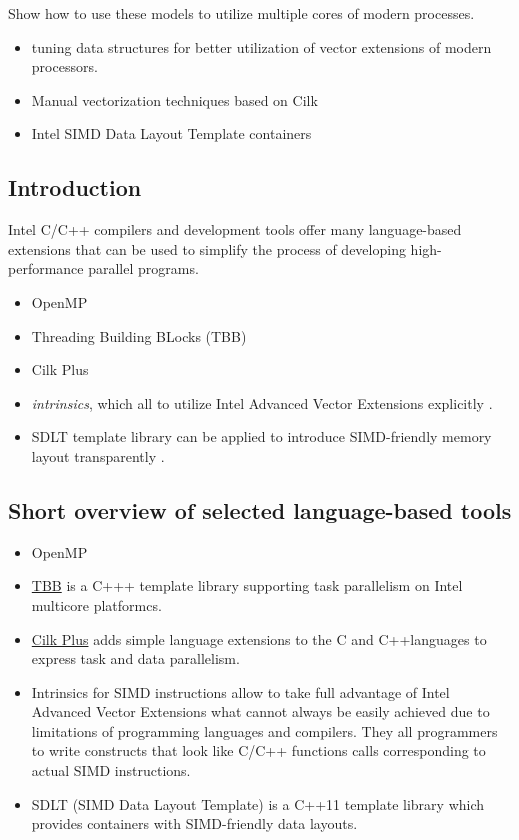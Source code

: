 \documentclass[11pt]{article}
\begin{document}
Show how to use these models to utilize multiple cores of modern processes.
\begin{itemize}
\item tuning data structures for better utilization of vector extensions of modern processors.
\item Manual vectorization techniques based on Cilk
\item Intel SIMD Data Layout Template containers
\end{itemize}

\subsection{Introduction}
\label{sec-5-1}
Intel C/C++ compilers and development tools offer many language-based extensions that can be used to simplify the process of developing high-performance parallel programs.
\begin{itemize}
\item OpenMP
\item Threading Building BLocks (TBB)
\item Cilk Plus
\item \emph{intrinsics}, which all to utilize Intel Advanced Vector Extensions explicitly \cite{16_intel_xeon_phi_proces_high_perfor_progr}.
\item SDLT template library can be applied to introduce SIMD-friendly memory layout transparently \cite{16_intel_xeon_phi_proces_high_perfor_progr}.
\end{itemize}

\subsection{Short overview of selected language-based tools}
\label{sec-5-2}
\begin{itemize}
\item OpenMP
\item \href{https://www.threadingbuildingblocks.org}{TBB} is a C+++ template library supporting task parallelism on Intel multicore platformcs.
\item \href{https://www.cilkplus.org}{Cilk Plus} adds simple language extensions to the C and C++languages to express task and data parallelism.
\item Intrinsics for SIMD instructions allow to take full advantage of Intel Advanced Vector Extensions what cannot always be easily achieved due to limitations of programming languages and compilers. They all programmers to write constructs that look like C/C++ functions calls corresponding to actual SIMD instructions.
\item SDLT (SIMD Data Layout Template) is a C++11 template library which provides containers with SIMD-friendly data layouts.
\end{itemize}
\end{document}
